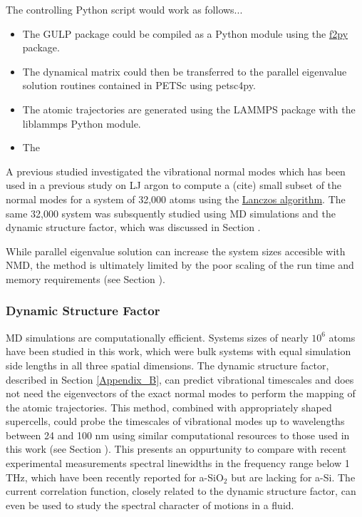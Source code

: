 The controlling Python script would work as follows...

\begin{itemize}
\item The GULP package could be 
compiled as a Python module using the 
\href{https://code.google.com/p/f2py/}{f2py} package. 
\item The dynamical 
matrix could then be transferred to the parallel eigenvalue solution 
routines contained in PETSc using petsc4py.
\item The atomic trajectories are generated using the LAMMPS 
package with the liblammps Python module.
\item The 
\end{itemize}

A previous studied investigated the vibrational normal modes 
which has been used in a previous study on LJ argon to compute a 
(cite) 
small subset of the normal modes for a system of 32,000 atoms
\cite{mazzacurati_low-frequency_1996} 
using the 
\href{http://en.wikipedia.org/wiki/Lanczos_algorithm}
{Lanczos algorithm}.\cite{golub_matrix_2012} 
The same 32,000 system was subsquently studied using MD simulations 
and the dynamic structure factor,\cite{ruocco_relaxation_2000} 
which was discussed in Section .

While parallel eigenvalue solution can increase the system sizes 
accesible with NMD, the method is ultimately limited by the 
poor scaling of the run time and memory requirements (see Section ). 

\subsubsection{\label{Future:Timescales:DSF}
Dynamic Structure Factor}

MD simulations are computationally efficient.  Systems sizes of nearly 
$10^6$ atoms have been studied in this work, which were bulk systems 
with equal simulation side lengths in all three spatial dimensions. 
The dynamic structure factor, described in Section \ref{Appendix_B}, 
can predict vibrational timescales and does not 
need the eigenvectors of the exact normal modes to perform the mapping 
of the atomic trajectories. This method, 
combined with appropriately shaped supercells, could probe the 
timescales of vibrational modes up to wavelengths between 
24 and 100 nm using similar computational resources to those 
used in this work (see Section ). 
This presents an oppurtunity to compare with recent experimental 
measurements spectral linewidths in the frequency range below 
1 THz, which have been recently reported for a-SiO$_2$ but are 
lacking for a-Si.\cite{hondongwa_ultrasonic_2011} 
The current correlation function, closely related to the dynamic 
structure factor,\cite{horbach_high_2001} can even be used to study 
the spectral character of motions in a fluid.\cite{boom_molecular_1980}  

